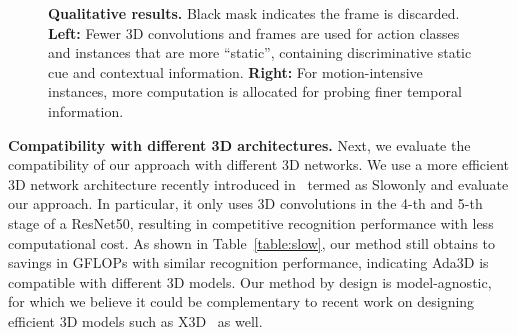 \documentclass[final]{cvpr}
\newcommand{\system}{{Ada3D}\xspace}
\begin{document}
\begin{figure*}[!t] \centering
    \vspace{-0.35in}
    \caption{\textbf{Qualitative results.} Black mask indicates the frame is discarded. \textbf{Left:} Fewer 3D convolutions and frames are used for action classes and instances that are more ``static'', \ie containing discriminative static cue and contextual information. \textbf{Right:} For motion-intensive instances, more computation is allocated for probing finer temporal information.}
   \label{fig:quals}
   \end{figure*}
\vspace{0.05in}
\noindent\textbf{Compatibility with different 3D architectures.} Next, we evaluate the compatibility of our approach with different 3D networks. We use a more efficient 3D network architecture recently introduced in~\cite{slowfast} termed as Slowonly and evaluate our approach. In particular, it only uses 3D convolutions in the 4-th and 5-th stage of a ResNet50, resulting in competitive recognition performance with less computational cost. As shown in Table~\ref{table:slow}, our method still obtains  to  savings in GFLOPs with similar recognition performance, indicating \system is compatible with different 3D models. Our method by design is model-agnostic, for which we believe it could be complementary to recent work on designing efficient 3D models such as X3D~\cite{x3d} as well. 

\begin{table}[h]  \centering
    \vspace{-0.1in}
    \caption{Results on FCVID~\cite{fcvid} using Slowonly~\cite{slowfast} architecture as 3D model. \textbf{Top}: 8-frame input setting. \textbf{Bottom}: 16-frame input setting.}
    \label{table:slow}
    \end{table}
    
\end{document}

